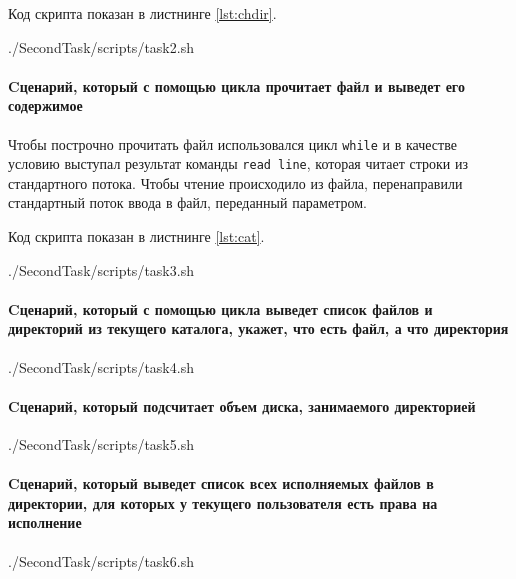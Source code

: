 Код скрипта показан в листнинге \ref{lst:chdir}.

	{./SecondTask/scripts/task2.sh}

\paragraph{Cценарий, который с помощью цикла прочитает файл и
выведет его содержимое}\mbox{}\par
Чтобы построчно прочитать файл использовался цикл \texttt{while} и в качестве
условию выступал результат команды \texttt{read line}, которая читает строки
из стандартного потока. Чтобы чтение происходило из файла, перенаправили
стандартный поток ввода в файл, переданный параметром.

Код скрипта показан в листнинге \ref{lst:cat}.

	{./SecondTask/scripts/task3.sh}

\paragraph{Cценарий, который с помощью цикла выведет список
файлов и директорий из текущего каталога, укажет, что есть файл, а
что директория}\mbox{}\par

	{./SecondTask/scripts/task4.sh}

\paragraph{Cценарий, который подсчитает объем диска, занимаемого
директорией}\mbox{}\par

	{./SecondTask/scripts/task5.sh}

\paragraph{Cценарий, который выведет список всех исполняемых
файлов в директории, для которых у текущего пользователя есть права
на исполнение}\mbox{}\par

	{./SecondTask/scripts/task6.sh}

